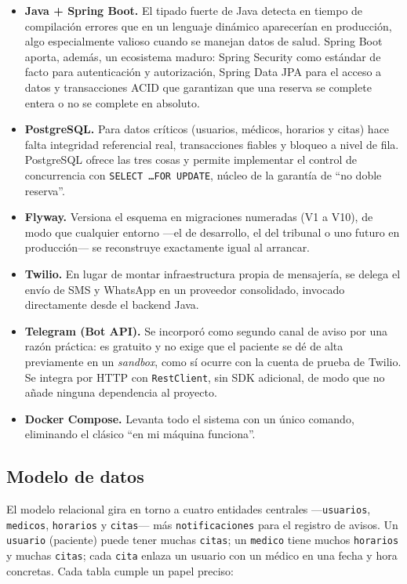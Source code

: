 \documentclass[12pt,a4paper]{report}
\begin{document}
\begin{itemize}
  \item \textbf{Java + Spring Boot.} El tipado fuerte de Java detecta en tiempo de compilación errores que en un lenguaje dinámico aparecerían en producción, algo especialmente valioso cuando se manejan datos de salud. Spring Boot aporta, además, un ecosistema maduro: Spring Security como estándar de facto para autenticación y autorización, Spring Data JPA para el acceso a datos y transacciones ACID que garantizan que una reserva se complete entera o no se complete en absoluto.
  \item \textbf{PostgreSQL.} Para datos críticos (usuarios, médicos, horarios y citas) hace falta integridad referencial real, transacciones fiables y bloqueo a nivel de fila. PostgreSQL ofrece las tres cosas y permite implementar el control de concurrencia con \texttt{SELECT \ldots FOR UPDATE}, núcleo de la garantía de ``no doble reserva''.
  \item \textbf{Flyway.} Versiona el esquema en migraciones numeradas (V1 a V10), de modo que cualquier entorno —el de desarrollo, el del tribunal o uno futuro en producción— se reconstruye exactamente igual al arrancar.
  \item \textbf{Twilio.} En lugar de montar infraestructura propia de mensajería, se delega el envío de SMS y WhatsApp en un proveedor consolidado, invocado directamente desde el backend Java.
  \item \textbf{Telegram (Bot API).} Se incorporó como segundo canal de aviso por una razón práctica: es gratuito y no exige que el paciente se dé de alta previamente en un \emph{sandbox}, como sí ocurre con la cuenta de prueba de Twilio. Se integra por HTTP con \texttt{RestClient}, sin SDK adicional, de modo que no añade ninguna dependencia al proyecto.
  \item \textbf{Docker Compose.} Levanta todo el sistema con un único comando, eliminando el clásico ``en mi máquina funciona''.
\end{itemize}

\subsection{Modelo de datos}



El modelo relacional gira en torno a cuatro entidades centrales —\texttt{usuarios}, \texttt{medicos}, \texttt{horarios} y \texttt{citas}— más \texttt{notificaciones} para el registro de avisos. Un \texttt{usuario} (paciente) puede tener muchas \texttt{citas}; un \texttt{medico} tiene muchos \texttt{horarios} y muchas \texttt{citas}; cada \texttt{cita} enlaza un usuario con un médico en una fecha y hora concretas. Cada tabla cumple un papel preciso:
\end{document}
